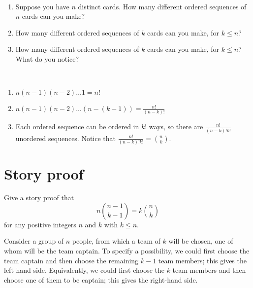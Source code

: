 	\begin{exercise}~
		\begin{enumerate}
			\item Suppose you have $n$ distinct cards. How many different ordered sequences of $n$ cards can you make?
			\item How many different ordered sequences of $k$ cards can you make, for $k \leq n$?
			\item How many different ordered sequences of $k$ cards can you make, for $k \leq n$? What do you notice?
		\end{enumerate}
		\begin{solution}~
			\begin{enumerate}
				\item $n(n - 1)(n - 2 )\ldots 1 = n!$
				\item $n(n - 1)(n - 2 )\ldots (n - (k-1)) = \frac{n!}{(n - k)!}$
				\item Each ordered sequence can be ordered in $k!$ ways, so there are $\frac{n!}{(n - k)!k!}$ unordered sequences. Notice that $\frac{n!}{(n - k)!k!} = \binom{n}{k}$.
			\end{enumerate}	
		\end{solution}
	\end{exercise}

\section{Story proof}
\label{sec:section-1.3}	 
	
	\begin{exercise}\label{ex:chap01:11}
		Give a story proof that
		\begin{equation}
			n \binom{n - 1}{k - 1} = k \binom{n}{k}
		\end{equation}
		for any positive integers $n$ and $k$ with $k \leq n$.
		\begin{solution}
			Consider a group of $n$ people, from which a team of $k$ will be chosen, one of whom will be the team captain. To specify a possibility, we could first choose the team captain and then choose the remaining $k - 1$ team members; this gives the left-hand side. Equivalently, we could first choose the $k$ team members and then choose one of them to be captain; this gives the right-hand side.
		\end{solution}
	\end{exercise}
	
